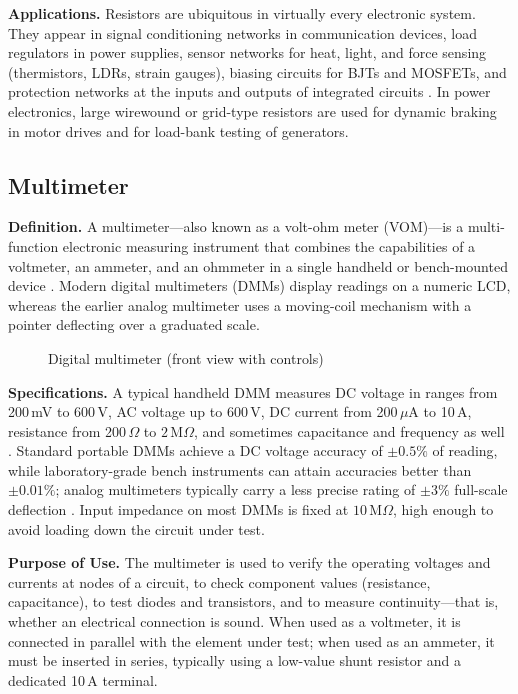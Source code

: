\documentclass[12pt, a4paper, twoside]{report}
\newcommand{\imgplaceholder}[2]{%
  \begin{figure}[H]
    \centering
    \fcolorbox{gray!60}{gray!12}{%
      \parbox[c][5cm][c]{0.65\textwidth}{%
        \centering
        \textcolor{gray!80}{\Large [Image Placeholder]}\\[6pt]
        \textcolor{gray}{\small Insert figure here}
      }%
    }
    \caption{#1}
    \label{fig:#2}
  \end{figure}
}
\begin{document}
\textbf{Applications.}\quad
Resistors are ubiquitous in virtually every electronic system. They appear in signal
conditioning networks in communication devices, load regulators in power supplies, sensor
networks for heat, light, and force sensing (thermistors, LDRs, strain gauges), biasing
circuits for BJTs and MOSFETs, and protection networks at the inputs and outputs of
integrated circuits \cite{boylestad2015}. In power electronics, large wirewound or
grid-type resistors are used for dynamic braking in motor drives and for load-bank testing
of generators.

\subsection{Multimeter}

\textbf{Definition.}\quad
A multimeter---also known as a volt-ohm meter (VOM)---is a multi-function electronic
measuring instrument that combines the capabilities of a voltmeter, an ammeter, and an
ohmmeter in a single handheld or bench-mounted device \cite{wiki:multimeter}. Modern
digital multimeters (DMMs) display readings on a numeric LCD, whereas the earlier analog
multimeter uses a moving-coil mechanism with a pointer deflecting over a graduated scale.

\imgplaceholder{Digital multimeter (front view with controls)}{multimeter}

\textbf{Specifications.}\quad
A typical handheld DMM measures DC voltage in ranges from 200\,mV to 600\,V, AC voltage
up to 600\,V, DC current from 200\,$\mu$A to 10\,A, resistance from 200\,$\Omega$ to
$2\,\text{M}\Omega$, and sometimes capacitance and frequency as well \cite{electronicsclub:multimeter}.
Standard portable DMMs achieve a DC voltage accuracy of $\pm0.5\%$ of reading, while
laboratory-grade bench instruments can attain accuracies better than $\pm0.01\%$; analog
multimeters typically carry a less precise rating of $\pm3\%$ full-scale deflection
\cite{wiki:multimeter}. Input impedance on most DMMs is fixed at $10\,\text{M}\Omega$,
high enough to avoid loading down the circuit under test.

\textbf{Purpose of Use.}\quad
The multimeter is used to verify the operating voltages and currents at nodes of a
circuit, to check component values (resistance, capacitance), to test diodes and
transistors, and to measure continuity---that is, whether an electrical connection is
sound. When used as a voltmeter, it is connected in parallel with the element under test;
when used as an ammeter, it must be inserted in series, typically using a low-value shunt
resistor and a dedicated 10\,A terminal.
\end{document}
